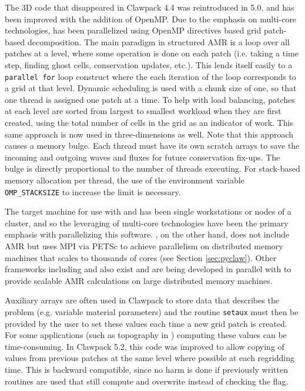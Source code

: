 The 3D \amrclaw code that disappeared in Clawpack 4.4 was reintroduced in
5.0, and has been improved with the addition of OpenMP.
Due to the emphasis on multi-core technologies, \amrclaw has been parallelized
using OpenMP directives based grid patch-based decomposition.  
The main paradigm in structured AMR is a loop over
all patches at a level, where some operation is done on each patch
(i.e. taking a time step, finding ghost cells, conservation
updates, etc.). This lends itself easily to a {\tt parallel for} loop
construct where the each iteration of the loop corresponds to a
grid at that level. Dynamic scheduling is used with a chunk size
of one, so that one thread is assigned one patch at a time. 
To help with load balancing, patches at
each level are sorted from largest to smallest workload when they
are first created, using
the total number of cells in the grid as an indicator of work.
This same approach is now used in three-dimensions as well. 
Note that this approach causes a memory bulge. Each thread
must have its own scratch arrays to save the incoming and
outgoing waves and fluxes for future conservation fix-ups. 
The bulge is directly proportional to the number
of threads executing. For stack-based memory allocation per
thread, the use of the environment variable 
{\tt OMP\_STACKSIZE} to increase the limit is necessary.


The target machine for use with \amrclaw and \geoclaw
has been single workstations or nodes of a cluster, and so
the leveraging of multi-core technologies have been the primary
emphasis with parallelizing this software.  
\pyclaw, on the other hand, does not include AMR but uses MPI via
PETSc to achieve parallelism on distributed memory machines that scales to
thousands of cores (see Section \ref{sec:pyclaw}).
Other frameworks including
\forestclaw \cite{Burstedde:we} and \boxlib {} also
exist and are being developed in parallel with \amrclaw to provide scalable
AMR calculations on large distributed memory machines.



Auxiliary arrays are often used in Clawpack to store data that 
describes the problem (e.g.  variable material parameters) and the routine
\texttt{setaux} must then be provided by the user to set these values each time a
new grid patch is created.  For some applications (such as topography in
\geoclaw) computing these values can be time-consuming.  In Clawpack 5.2,
this code was improved to allow copying of values from previous patches at
the same level where possible at each regridding time. 
This is backward compatible, since no harm is done if previously
written routines are used that still compute and overwrite instead of
checking the flag.  

